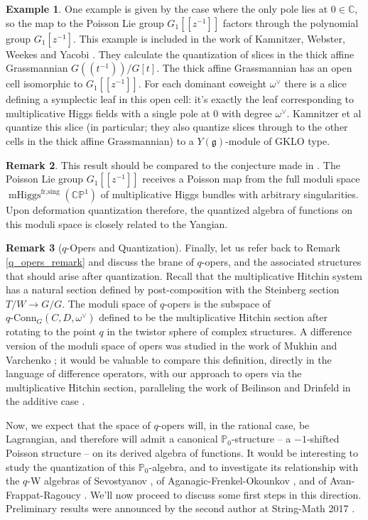 \documentclass[11pt, oneside, reqno]{amsart}
\theoremstyle{definition} \newtheorem{definition}{Definition}[section]
\theoremstyle{definition} \newtheorem{remark}[definition]{Remark}
\theoremstyle{definition} \newtheorem{remarks}[definition]{Remarks}
\theoremstyle{definition} \newtheorem{question}[definition]{Question}
\theoremstyle{definition} \newtheorem*{note}{Note}
\theoremstyle{definition} \newtheorem{example}[definition]{Example}
\theoremstyle{definition} \newtheorem{examples}[definition]{Examples}
\renewcommand{\gg}{\mathfrak{g}}
\newcommand{\bb}[1]{\mathbb{#1}}
\newcommand{\CC}{\mathbb{C}}
\DeclareMathOperator{\mhiggs}{mHiggs}
\newcommand{\qconn}{q\text{-Conn}}
\begin{document}
\begin{example}
One example is given by the case where the only pole lies at $0 \in \CC$, so the map to the Poisson Lie group $G_1[[z^{-1}]]$ factors through the polynomial group $G_1[z^{-1}]$.  This example is included in the work of Kamnitzer, Webster, Weekes and Yacobi \cite{KWWY}.  They calculate the quantization of slices in the thick affine Grassmannian $G(\!(t^{-1})\!)/G[t]$.  The thick affine Grassmannian has an open cell isomorphic to $G_1[[z^{-1}]]$.  For each dominant coweight $\omega^\vee$ there is a slice defining a symplectic leaf in this open cell: it's exactly the leaf corresponding to multiplicative Higgs fields with a single pole at 0 with degree $\omega^\vee$.  Kamnitzer et al quantize this slice (in particular; they also quantize slices through to the other cells in the thick affine Grassmannian) to a $Y(\gg)$-module of GKLO type. 
\end{example}

\begin{remark}
This result should be compared to the conjecture made in \cite[Chapter 8.1]{NekrasovPestun}.  The Poisson Lie group $G_1[[z^{-1}]]$ receives a Poisson map from the full moduli space $\mhiggs^{\text{fr,sing}}(\bb{CP}^1)$ of multiplicative Higgs bundles with arbitrary singularities.  Upon deformation quantization therefore, the quantized algebra of functions on this moduli space is closely related to the Yangian.
\end{remark}

\begin{remark}[$q$-Opers and Quantization]
Finally, let us refer back to Remark \ref{q_opers_remark} and discuss the brane of $q$-opers, and the associated structures that should arise after quantization.  Recall that the multiplicative Hitchin system has a natural section defined by post-composition with the Steinberg section $T/W \to G/G$.  The moduli space of $q$-opers is the subspace of $\qconn_G(C,D,\omega^\vee)$ defined to be the multiplicative Hitchin section after rotating to the point $q$ in the twistor sphere of complex structures.  A difference version of the moduli space of opers was studied in the work of Mukhin and Varchenko \cite{MukhinVarchenko}; it would be valuable to compare this definition, directly in the language of difference operators, with our approach to opers via the multiplicative Hitchin section, paralleling the work of Beilinson and Drinfeld in the additive case \cite[Section 3.1]{BDHitchin}.

Now, we expect that the space of $q$-opers will, in the rational case, be Lagrangian, and therefore will admit a canonical $\bb P_0$-structure -- a $-1$-shifted Poisson structure -- on its derived algebra of functions.  It would be interesting to study the quantization of this $\bb P_0$-algebra, and to investigate its relationship with the $q$-W algebras of Sevostyanov \cite{Knight,STSSevostyanov, Sevostyanov}, of Aganagic-Frenkel-Okounkov \cite{AFO}, and of Avan-Frappat-Ragoucy \cite{AvanFrappatRagoucy}.  We'll now proceed to discuss some first steps in this direction.  Preliminary results were announced by the second author at String-Math 2017 \cite{PestunStringMath}.  
\end{remark}
\end{document}
